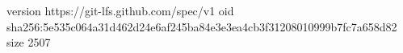version https://git-lfs.github.com/spec/v1
oid sha256:5e535c064a31d462d24e6af245ba84e3e3ea4cb3f31208010999b7fc7a658d82
size 2507
